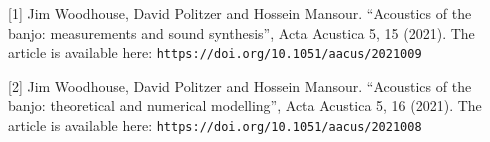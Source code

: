   \sectionreferences{}[1] Jim Woodhouse, David Politzer and Hossein Mansour. 
  “Acoustics of the banjo: measurements and sound synthesis”, Acta Acustica 5, 
  15 (2021). The article is available here: 
  \tt{}https://doi.org/10.1051/aacus/2021009\rm{} 

  [2] Jim Woodhouse, David Politzer and Hossein Mansour. “Acoustics of the 
  banjo: theoretical and numerical modelling”, Acta Acustica 5, 16 (2021). The 
  article is available here: \tt{}https://doi.org/10.1051/aacus/2021008\rm{} 